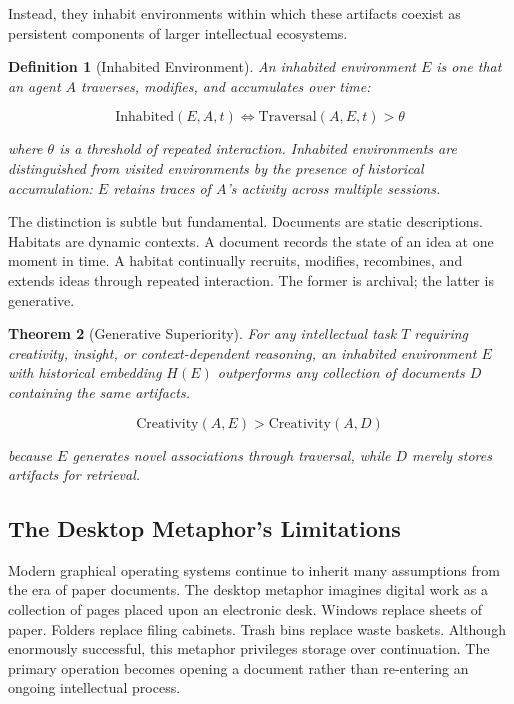\documentclass[12pt,oneside]{article}
\newtheorem{definition}{Definition}[section]
\newtheorem{theorem}[definition]{Theorem}
\theoremstyle{remark}
\begin{document}
Instead, they inhabit environments within which these artifacts coexist as persistent components of larger intellectual ecosystems.

\begin{definition}[Inhabited Environment]
An inhabited environment $E$ is one that an agent $A$ traverses, modifies, and accumulates over time:

\begin{equation}
\text{Inhabited}(E, A, t) \iff \text{Traversal}(A, E, t) > \theta
\end{equation}

where $\theta$ is a threshold of repeated interaction. Inhabited environments are distinguished from visited environments by the presence of historical accumulation: $E$ retains traces of $A$'s activity across multiple sessions.
\end{definition}

The distinction is subtle but fundamental. Documents are static descriptions. Habitats are dynamic contexts. A document records the state of an idea at one moment in time. A habitat continually recruits, modifies, recombines, and extends ideas through repeated interaction. The former is archival; the latter is generative.

\begin{theorem}[Generative Superiority]
For any intellectual task $T$ requiring creativity, insight, or context-dependent reasoning, an inhabited environment $E$ with historical embedding $H(E)$ outperforms any collection of documents $D$ containing the same artifacts.

\begin{equation}
\text{Creativity}(A, E) > \text{Creativity}(A, D)
\end{equation}

because $E$ generates novel associations through traversal, while $D$ merely stores artifacts for retrieval.
\end{theorem}

\subsection{The Desktop Metaphor's Limitations}

Modern graphical operating systems continue to inherit many assumptions from the era of paper documents. The desktop metaphor imagines digital work as a collection of pages placed upon an electronic desk. Windows replace sheets of paper. Folders replace filing cabinets. Trash bins replace waste baskets. Although enormously successful, this metaphor privileges storage over continuation. The primary operation becomes opening a document rather than re-entering an ongoing intellectual process.
\end{document}
